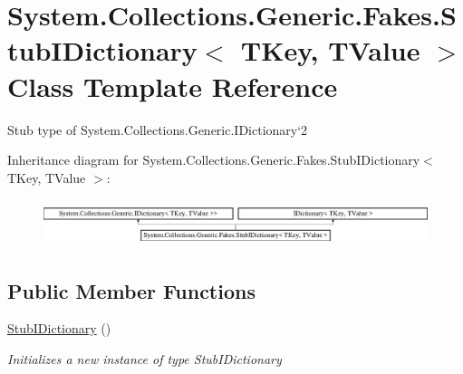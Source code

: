 \hypertarget{class_system_1_1_collections_1_1_generic_1_1_fakes_1_1_stub_i_dictionary_3_01_t_key_00_01_t_value_01_4}{\section{System.\-Collections.\-Generic.\-Fakes.\-Stub\-I\-Dictionary$<$ T\-Key, T\-Value $>$ Class Template Reference}
\label{class_system_1_1_collections_1_1_generic_1_1_fakes_1_1_stub_i_dictionary_3_01_t_key_00_01_t_value_01_4}
}


Stub type of System.\-Collections.\-Generic.\-I\-Dictionary`2 


Inheritance diagram for System.\-Collections.\-Generic.\-Fakes.\-Stub\-I\-Dictionary$<$ T\-Key, T\-Value $>$\-:\begin{figure}[H]
\begin{center}
\leavevmode
\includegraphics[height=1.382716cm]{class_system_1_1_collections_1_1_generic_1_1_fakes_1_1_stub_i_dictionary_3_01_t_key_00_01_t_value_01_4}
\end{center}
\end{figure}
\subsection*{Public Member Functions}
\begin{DoxyCompactItemize}
\item 
\hyperlink{class_system_1_1_collections_1_1_generic_1_1_fakes_1_1_stub_i_dictionary_3_01_t_key_00_01_t_value_01_4_abcf496dbadcf48f153e41d41e612e036}{Stub\-I\-Dictionary} ()
\begin{DoxyCompactList}\small\item\em Initializes a new instance of type Stub\-I\-Dictionary\end{DoxyCompactList}\end{DoxyCompactItemize}
